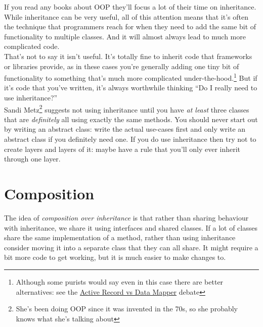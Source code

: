 
If you read any books about OOP they'll focus a lot of their time on inheritance. While inheritance can be very useful, all of this attention means that it's often the technique that programmers reach for when they need to add the same bit of functionality to multiple classes. And it will almost always lead to much more complicated code.
\\

That's not to say it isn't useful. It's totally fine to inherit code that frameworks or libraries provide, as in these cases you're generally adding one tiny bit of functionality to something that's much more complicated under-the-hood.\footnote{Although some purists would say even in this case there are better alternatives: see the \href{https://www.thoughtfulcode.com/orm-active-record-vs-data-mapper/}{Active Record vs Data Mapper} debate} But if it's code that you've written, it's always worthwhile thinking ``Do I really need to use inheritance?''
\\

Sandi Metz\footnote{She's been doing OOP since it was invented in the 70s, so she probably knows what she's talking about} suggests not using inheritance until you have \textit{at least} three classes that are \textit{definitely} all using exactly the same methods. You should never start out by writing an abstract class: write the actual use-cases first and only write an abstract class if you definitely need one. If you do use inheritance then try not to create layers and layers of it: maybe have a rule that you'll only ever inherit through one layer.



\section{Composition}


The idea of \textit{composition over inheritance} is that rather than sharing behaviour with inheritance, we share it using interfaces and shared classes. If a lot of classes share the same implementation of a method, rather than using inheritance consider moving it into a separate class that they can all share. It might require a bit more code to get working, but it is much easier to make changes to.


